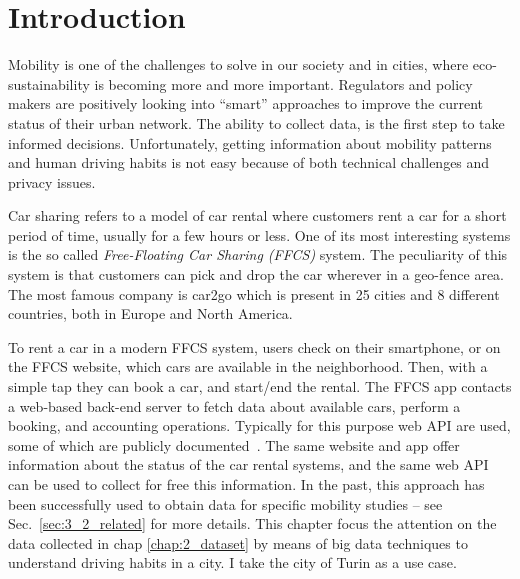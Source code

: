 \section{Introduction}
\label{sec:3_1_intro}

Mobility is one of the challenges to solve in our society and in cities, where eco-sustainability is becoming more and more important. 
Regulators and policy makers are positively looking into ``smart'' approaches to improve the current status of their urban network.  The ability to collect data, is the first step to take informed decisions. Unfortunately, getting information about mobility patterns and human driving habits is not easy because of both technical challenges and privacy issues.


Car sharing refers to a model of car rental where customers rent a car for a short period of time, usually for a few hours or less. One of its most interesting systems is the so called \textit{Free-Floating Car Sharing (FFCS)} system. The peculiarity of this system is that customers can pick and drop the car wherever in a geo-fence area.
The most famous company is car2go which is present in 25 cities and 8 different countries, both in Europe and North America.

To rent a car in a modern FFCS system, users check on their smartphone, or on the FFCS website, which cars are available in the neighborhood. Then, with a simple tap they can book a car, and start/end the rental. The FFCS app contacts a web-based back-end server to fetch data about available cars, perform a booking, and accounting operations. Typically for this purpose web API are used, some of which are publicly documented~\cite{car2goAPI}. The same website and app offer information about the status of the car rental systems, and the same web API can be used to collect for free this information. In the past, this approach has been successfully used to obtain data for specific mobility studies -- see Sec.~\ref{sec:3_2_related} for more details. This chapter focus the attention on the data collected in chap \ref{chap:2_dataset} by means of big data techniques to understand driving habits in a city. I take the city of Turin as a use case.


